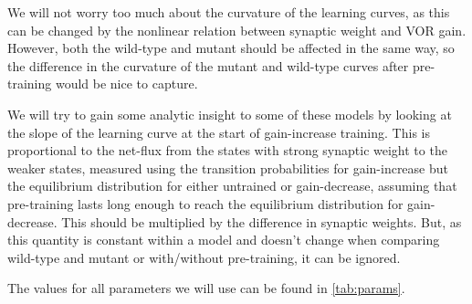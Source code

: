 \documentclass[12pt]{article}
\begin{document}
We will not worry too much about the curvature of the learning curves, as this can be changed by the nonlinear relation between synaptic weight and VOR gain.
However, both the wild-type and mutant should be affected in the same way, so the difference in the curvature of the mutant and wild-type curves after pre-training would be nice to capture.

We will try to gain some analytic insight to some of these models by looking at the slope of the learning curve at the start of gain-increase training.
This is proportional to the net-flux from the states with strong synaptic weight to the weaker states, measured using the transition probabilities for gain-increase but the equilibrium distribution for either untrained or gain-decrease, assuming that pre-training lasts long enough to reach the equilibrium distribution for gain-decrease.
This should be multiplied by the difference in synaptic weights.
But, as this quantity is constant within a model and doesn't change when comparing wild-type and mutant or with/without pre-training, it can be ignored.

The values for all parameters we will use can be found in \autoref{tab:params}.
\end{document}
